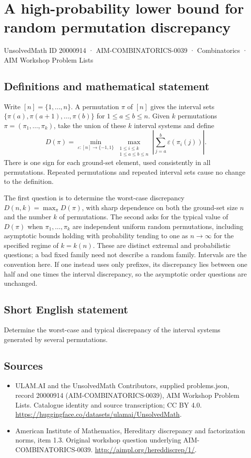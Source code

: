\documentclass[11pt,a4paper]{article}
\begin{document}
\section*{A high-probability lower bound for random permutation discrepancy}\label{20000914}
{\small UnsolvedMath ID 20000914 · AIM-COMBINATORICS-0039 · Combinatorics · AIM Workshop Problem Lists}
\subsection{Definitions and mathematical statement}
Write $[n]=\{1,\ldots,n\}$. A permutation $\pi$ of $[n]$ gives the
interval sets $\{\pi(a),\pi(a+1),\ldots,\pi(b)\}$ for
$1\le a\le b\le n$. Given $k$ permutations
$\pi=(\pi_1,\ldots,\pi_k)$, take the union of these $k$
interval systems and define
\[
 D(\pi)=\min_{\varepsilon:[n]\to\{-1,1\}}
 \max_{\substack{1\le i\le k\\1\le a\le b\le n}}
 \left|\sum_{j=a}^b\varepsilon(\pi_i(j))\right|.
\]
There is one sign for each ground-set element, used consistently in all
permutations. Repeated permutations and repeated interval sets cause no
change to the definition.

The first question is to determine the worst-case discrepancy
$D(n,k)=\max_{\pi}D(\pi)$, with sharp dependence
on both the ground-set size $n$ and the number $k$ of permutations.
The second asks for the typical value of $D(\pi)$ when
$\pi_1,\ldots,\pi_k$ are independent uniform random permutations,
including asymptotic bounds holding with probability tending to one as
$n\to\infty$ for the specified regime of $k=k(n)$.
These are distinct extremal and probabilistic questions; a bad fixed
family need not describe a random family. Intervals are the convention
here. If one instead uses only prefixes, its discrepancy lies between
one half and one times the interval discrepancy, so the asymptotic
order questions are unchanged.
\subsection{Short English statement}
Determine the worst-case and typical discrepancy of the interval systems generated by several permutations.
\subsection{Sources}
\begin{itemize}
\item[S1] ULAM.AI and the UnsolvedMath Contributors, supplied problems.json, record 20000914 (AIM-COMBINATORICS-0039), AIM Workshop Problem Lists. Catalogue identity and source transcription; CC BY 4.0.
\url{https://huggingface.co/datasets/ulamai/UnsolvedMath}.
\item[S2] American Institute of Mathematics, Hereditary discrepancy and factorization norms, item 1.3. Original workshop question underlying AIM-COMBINATORICS-0039.
\url{http://aimpl.org/hereddiscrep/1/}.
\end{itemize}
\end{document}
